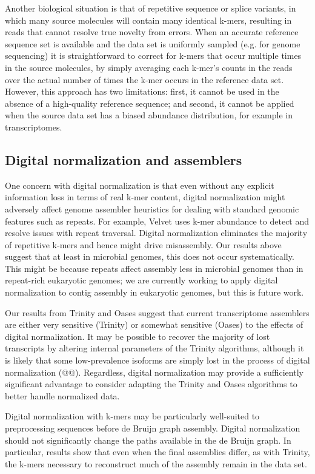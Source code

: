 \documentclass[10pt]{article}
\begin{document}
Another biological situation is that of repetitive sequence or splice
variants, in which many source molecules will contain many identical
k-mers, resulting in reads that cannot resolve true novelty from errors.  When an accurate reference sequence set is available and the
data set is uniformly sampled (e.g. for genome sequencing) it is
straightforward to correct for k-mers that occur multiple times in the
source molecules, by simply averaging each k-mer's counts in the reads
over the actual number of times the k-mer occurs in the reference data
set.  However, this approach has two limitations: first, it cannot be
used in the absence of a high-quality reference sequence; and second,
it cannot be applied when the source data set has a biased abundance
distribution, for example in transcriptomes.

\subsection*{Digital normalization and assemblers}

One concern with digital normalization is that even without any
explicit information loss in terms of real k-mer content, digital
normalization might adversely affect genome assembler heuristics for
dealing with standard genomic features such as repeats.  For example,
Velvet uses k-mer abundance to detect and resolve issues with repeat
traversal.  Digital normalization eliminates the majority of
repetitive k-mers and hence might drive misassembly. Our results above
suggest that at least in microbial genomes, this does not occur
systematically.  This might be because repeats affect assembly less in
microbial genomes than in repeat-rich eukaryotic genomes; we are
currently working to apply digital normalization to contig assembly in
eukaryotic genomes, but this is future work.

Our results from Trinity and Oases suggest that current transcriptome
assemblers are either very sensitive (Trinity) or somewhat sensitive
(Oases) to the effects of digital normalization.  It may be possible
to recover the majority of lost transcripts by altering internal
parameters of the Trinity algorithms, although it is likely that some
low-prevalence isoforms are simply lost in the process of digital
normalization (@@).  Regardless, digital normalization may provide
a sufficiently significant advantage to consider adapting the Trinity
and Oases algorithms to better handle normalized data.

Digital normalization with k-mers may be particularly well-suited to
preprocessing sequences before de Bruijn graph assembly.  Digital
normalization should not significantly change the paths available in
the de Bruijn graph.  In particular, results show that even when the
final assemblies differ, as with Trinity, the k-mers necessary to
reconstruct much of the assembly remain in the data set.
\end{document}
